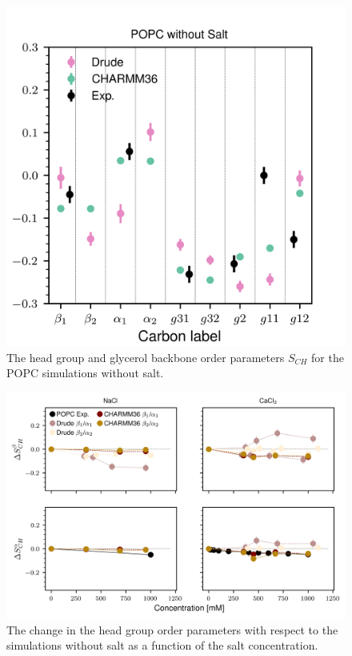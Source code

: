 \documentclass[journal=jacsat,manuscript=article,layout=singlecolumn]{achemso}
\begin{document}
\begin{figure}[!hbt]
	\centering
	\includegraphics{popc_order_parameters_nosalt.png}
	\caption{The head group and glycerol backbone order parameters $S_{CH}$ for the POPC simulations without salt.}
	\label{fig:popc_order_no_salt}
\end{figure}

\begin{figure}[!hbt]
	\centering
	\includegraphics{popc_order_parameter_change.png}
	\caption{The change in the head group order parameters with respect to the simulations without salt as a function of the salt concentration.}
	\label{fig:popc_order_parameter_change}
\end{figure}
\end{document}
